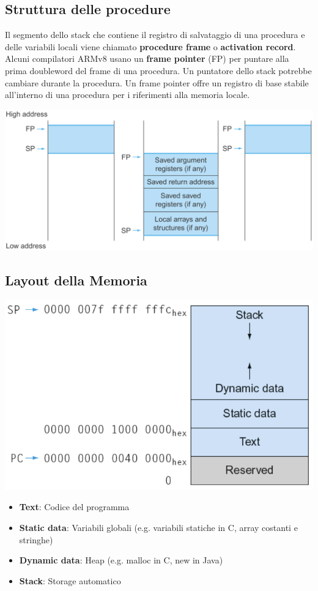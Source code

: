 \documentclass[12pt,a4paper]{article}
\begin{document}
\subsection{Struttura delle procedure}
Il segmento dello stack che contiene il registro di salvataggio di una procedura e delle variabili locali viene chiamato \textbf{procedure frame} o \textbf{activation record}.\\
Alcuni compilatori ARMv8 usano un \textbf{frame pointer} (FP) per puntare alla prima doubleword del frame di una procedura. Un puntatore dello stack potrebbe cambiare durante la procedura. Un frame pointer offre un registro di base stabile all'interno di una procedura per i riferimenti alla memoria locale.
\begin{center}
\includegraphics[width=0.7\columnwidth]{img/procedure_frame.png}
\end{center}

\subsection{Layout della Memoria}
\begin{center}
\includegraphics[width=0.7\columnwidth]{img/memory_layout.png}
\end{center}
\begin{itemize}
\item \textbf{Text}: Codice del programma
\item \textbf{Static data}: Variabili globali (e.g. variabili statiche in C, array costanti e stringhe)
\item \textbf{Dynamic data}: Heap (e.g. malloc in C, new in Java)
\item \textbf{Stack}: Storage automatico
\end{itemize}
\end{document}
